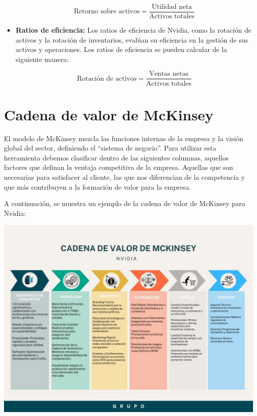 \documentclass{article}
\begin{document}
\begin{itemize}
  \begin{equation}
    \text{Retorno sobre activos} = \frac{\text{Utilidad neta}}{\text{Activos totales}}
  \end{equation}

  \item \textbf{Ratios de eficiencia:} Los ratios de eficiencia de Nvidia, como la rotación de activos y la rotación de inventarios, evalúan su eficiencia en la gestión de sus activos y operaciones. Los ratios de eficiencia se pueden calcular de la siguiente manera:
  
  \begin{equation}
    \text{Rotación de activos} = \frac{\text{Ventas netas}}{\text{Activos totales}}
  \end{equation}

\end{itemize}

\newpage

\section{Cadena de valor de McKinsey}

El modelo de McKinsey mezcla las funciones internas de la empresa y la visión global del sector, definiendo el “sistema de negocio”. Para utilizar esta herramienta debemos clasificar dentro de las siguientes columnas, aquellos factores que definan la ventaja competitiva de la empresa. Aquellas que son necesarias para satisfacer al cliente, las que nos diferencian de la competencia y que más contribuyen a la formación de valor para la empresa.

A continuación, se muestra un ejemplo de la cadena de valor de McKinsey para Nvidia:

\begin{center}
  \includegraphics[width=15cm]{./assets/WhatsApp Image 2024-10-24 at 9.53.00 AM.jpeg}
\end{center}
\end{document}
